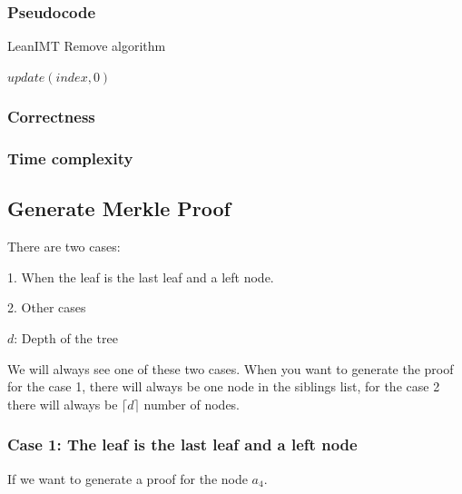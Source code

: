 \documentclass{article}
\begin{document}
\subsubsection{Pseudocode}

\begin{algorithm}[H]
    \caption{LeanIMT Remove algorithm}\label{remove}
    \begin{algorithmic}[1]
        \State $update(index, 0)$
        \EndProcedure
    \end{algorithmic}
\end{algorithm}



\subsubsection{Correctness}



\subsubsection{Time complexity}



\subsection{Generate Merkle Proof}

There are two cases:

1. When the leaf is the last leaf and a left node.

2. Other cases



$d$: Depth of the tree

We will always see one of these two cases. When you want to generate the proof for the case 1, there will always be one node in the siblings list, for the case 2 there will always be $\lceil d \rceil$ number of nodes.



\subsubsection*{Case 1: The leaf is the last leaf and a left node}



If we want to generate a proof for the node $a_4$.
\end{document}
